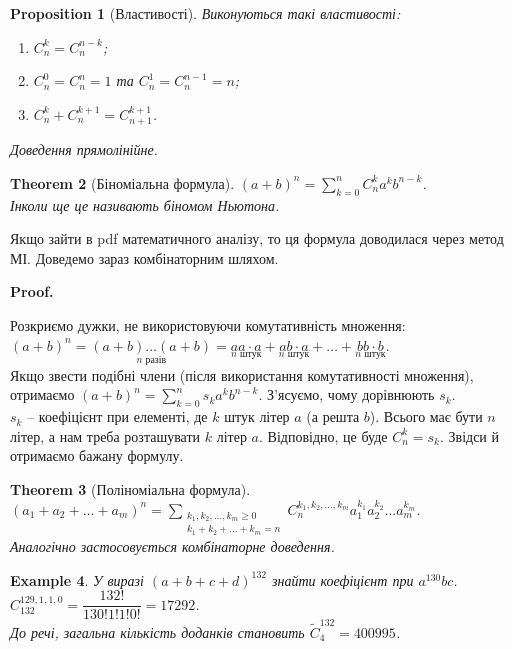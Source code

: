 \documentclass[a4paper, 14pt]{extarticle}
\makeatletter
\theoremstyle{theoremdd}
\newtheorem{theorem}{Theorem}[subsection]
\theoremstyle{theoremdd}
\theoremstyle{theoremdd}
\theoremstyle{theoremdd}
\theoremstyle{theoremdd}
\newtheorem{example}[theorem]{Example}
\theoremstyle{theoremdd}
\theoremstyle{theoremdd}
\theoremstyle{theoremdd}
\theoremstyle{theoremdd}
\newtheorem{proposition}[theorem]{Proposition}
\theoremstyle{theoremdd}
\theoremstyle{theoremdd}
\theoremstyle{theoremdd}
\theoremstyle{theoremdd}
\theoremstyle{theoremdd}
\theoremstyle{theoremdd}
\renewenvironment{proof}[1][Proof.\\]{\par
\pushQED{\hfill \qed}%
\normalfont \topsep6\p@\@plus6\p@\relax
\trivlist
\item\relax
{\bfseries
#1\@addpunct{.}}\hspace\labelsep\ignorespaces
}{%
\popQED\endtrivlist\@endpefalse
}
\makeatother
\begin{document}
\begin{proposition}[Властивості]
Виконуються такі властивості:
\begin{enumerate}[nosep, wide=0pt, label={\arabic*)}]
\item $C_n^k = C_n^{n-k}$;
\item $C_n^0 = C_n^n = 1$ та $C_n^1 = C_n^{n-1} = n$;
\item $C_n^k + C_n^{k+1} = C_{n+1}^{k+1}$.
\end{enumerate}
\textit{Доведення прямолінійне.}
\end{proposition}

\begin{theorem}[Біноміальна формула]
$(a+b)^n = \displaystyle\sum_{k=0}^n C_n^k a^k b^{n-k}$.\\
\textit{Інколи ще це називають біномом Ньютона.}
\end{theorem}
Якщо зайти в pdf математичного аналізу, то ця формула доводилася через метод МІ. Доведемо зараз комбінаторним шляхом.

\begin{proof}
Розкриємо дужки, не використовуючи комутативність множення:\\
$(a+b)^n = \underset{n \text{ разів}}{(a+b) \dots (a+b)} = \underset{n \text{ штук}}{aa \cdot a} + \underset{n \text{ штук}}{ab \cdot a} + \dots + \underset{n \text{ штук}}{bb \cdot b}$.\\
Якщо звести подібні члени (після використання комутативності множення), отримаємо $(a+b)^n = \displaystyle\sum_{k=0}^n s_k a^k b^{n-k}$. З'ясуємо, чому дорівнюють $s_k$.\\
$s_k$ -- коефіцієнт при елементі, де $k$ штук літер $a$ (а решта $b$). Всього має бути $n$ літер, а нам треба розташувати $k$ літер $a$. Відповідно, це буде $C_n^k = s_k$. Звідси й отримаємо бажану формулу.
\end{proof}

\begin{theorem}[Поліноміальна формула]
$(a_1+a_2+\dots+a_m)^n = \displaystyle\sum_{\substack{k_1,k_2,\dots,k_m \geq 0 \\ k_1+k_2+\dots+k_m=n}} C_n^{k_1,k_2,\dots,k_m} a_1^{k_1} a_2^{k_2} \dots a_m^{k_m}$.\\
\textit{Аналогічно застосовується комбінаторне доведення.}
\end{theorem}

\begin{example}
У виразі $(a+b+c+d)^{132}$ знайти коефіцієнт при $a^{130}bc$.\\
$C_{132}^{129,1,1,0} = \dfrac{132!}{130!1!1!0!} = 17292$.\\
До речі, загальна кількість доданків становить $\tilde{C}_4^{132} = 400995$.
\end{example}
\newpage
\end{document}
